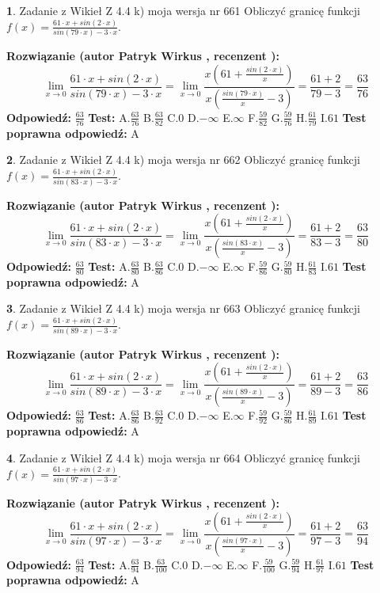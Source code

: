 \documentclass[12pt, a4paper]{article}
\theoremstyle{definition} %
\newtheorem{zad}{}
\newcommand{\zadStart}[1]{\begin{zad}#1\newline}
\newcommand{\zadStop}{\end{zad}}
\newcommand{\rozwStart}[2]{\noindent \textbf{Rozwiązanie (autor #1 , recenzent #2): }\newline}
\newcommand{\rozwStop}{\newline}
\newcommand{\odpStart}{\noindent \textbf{Odpowiedź:}\newline}
\newcommand{\odpStop}{\newline}
\newcommand{\testStart}{\noindent \textbf{Test:}\newline}
\newcommand{\testStop}{\newline}
\newcommand{\kluczStart}{\noindent \textbf{Test poprawna odpowiedź:}\newline}
\newcommand{\kluczStop}{\newline}
\begin{document}
\zadStart{Zadanie z Wikieł Z 4.4 k) moja wersja nr 661}
Obliczyć granicę funkcji $f(x)=\frac{61\cdot x +sin(2\cdot x)}{sin(79\cdot x) -3\cdot x}$.
\zadStop
\rozwStart{Patryk Wirkus}{}
$$\lim\limits_{x\to 0}\frac{61\cdot x +sin(2\cdot x)}{sin(79\cdot x) -3\cdot x}
=\lim\limits_{x\to 0}\frac{x(61+\frac{sin(2\cdot x)}{x})}{x(\frac{sin(79\cdot x)}{x}-3)}
=\frac{61+2}{79-3} = \frac{63}{76}$$
\rozwStop
\odpStart
$\frac{63}{76}$
\odpStop
\testStart
A.$\frac{63}{76}$
B.$\frac{63}{82}$
C.$0$
D.$-\infty$
E.$\infty$
F.$\frac{59}{82}$
G.$\frac{59}{76}$
H.$\frac{61}{79}$
I.$61$
\testStop
\kluczStart
A
\kluczStop



\zadStart{Zadanie z Wikieł Z 4.4 k) moja wersja nr 662}
Obliczyć granicę funkcji $f(x)=\frac{61\cdot x +sin(2\cdot x)}{sin(83\cdot x) -3\cdot x}$.
\zadStop
\rozwStart{Patryk Wirkus}{}
$$\lim\limits_{x\to 0}\frac{61\cdot x +sin(2\cdot x)}{sin(83\cdot x) -3\cdot x}
=\lim\limits_{x\to 0}\frac{x(61+\frac{sin(2\cdot x)}{x})}{x(\frac{sin(83\cdot x)}{x}-3)}
=\frac{61+2}{83-3} = \frac{63}{80}$$
\rozwStop
\odpStart
$\frac{63}{80}$
\odpStop
\testStart
A.$\frac{63}{80}$
B.$\frac{63}{86}$
C.$0$
D.$-\infty$
E.$\infty$
F.$\frac{59}{86}$
G.$\frac{59}{80}$
H.$\frac{61}{83}$
I.$61$
\testStop
\kluczStart
A
\kluczStop



\zadStart{Zadanie z Wikieł Z 4.4 k) moja wersja nr 663}
Obliczyć granicę funkcji $f(x)=\frac{61\cdot x +sin(2\cdot x)}{sin(89\cdot x) -3\cdot x}$.
\zadStop
\rozwStart{Patryk Wirkus}{}
$$\lim\limits_{x\to 0}\frac{61\cdot x +sin(2\cdot x)}{sin(89\cdot x) -3\cdot x}
=\lim\limits_{x\to 0}\frac{x(61+\frac{sin(2\cdot x)}{x})}{x(\frac{sin(89\cdot x)}{x}-3)}
=\frac{61+2}{89-3} = \frac{63}{86}$$
\rozwStop
\odpStart
$\frac{63}{86}$
\odpStop
\testStart
A.$\frac{63}{86}$
B.$\frac{63}{92}$
C.$0$
D.$-\infty$
E.$\infty$
F.$\frac{59}{92}$
G.$\frac{59}{86}$
H.$\frac{61}{89}$
I.$61$
\testStop
\kluczStart
A
\kluczStop



\zadStart{Zadanie z Wikieł Z 4.4 k) moja wersja nr 664}
Obliczyć granicę funkcji $f(x)=\frac{61\cdot x +sin(2\cdot x)}{sin(97\cdot x) -3\cdot x}$.
\zadStop
\rozwStart{Patryk Wirkus}{}
$$\lim\limits_{x\to 0}\frac{61\cdot x +sin(2\cdot x)}{sin(97\cdot x) -3\cdot x}
=\lim\limits_{x\to 0}\frac{x(61+\frac{sin(2\cdot x)}{x})}{x(\frac{sin(97\cdot x)}{x}-3)}
=\frac{61+2}{97-3} = \frac{63}{94}$$
\rozwStop
\odpStart
$\frac{63}{94}$
\odpStop
\testStart
A.$\frac{63}{94}$
B.$\frac{63}{100}$
C.$0$
D.$-\infty$
E.$\infty$
F.$\frac{59}{100}$
G.$\frac{59}{94}$
H.$\frac{61}{97}$
I.$61$
\testStop
\kluczStart
A
\kluczStop
\end{document}
